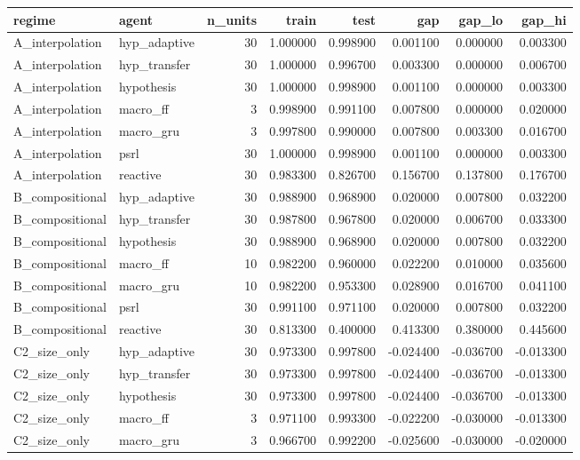 \begin{tabular}{llrrrrrr}
\toprule
regime & agent & n\_units & train & test & gap & gap\_lo & gap\_hi \\
\midrule
A\_interpolation & hyp\_adaptive & 30 & 1.000000 & 0.998900 & 0.001100 & 0.000000 & 0.003300 \\
A\_interpolation & hyp\_transfer & 30 & 1.000000 & 0.996700 & 0.003300 & 0.000000 & 0.006700 \\
A\_interpolation & hypothesis & 30 & 1.000000 & 0.998900 & 0.001100 & 0.000000 & 0.003300 \\
A\_interpolation & macro\_ff & 3 & 0.998900 & 0.991100 & 0.007800 & 0.000000 & 0.020000 \\
A\_interpolation & macro\_gru & 3 & 0.997800 & 0.990000 & 0.007800 & 0.003300 & 0.016700 \\
A\_interpolation & psrl & 30 & 1.000000 & 0.998900 & 0.001100 & 0.000000 & 0.003300 \\
A\_interpolation & reactive & 30 & 0.983300 & 0.826700 & 0.156700 & 0.137800 & 0.176700 \\
B\_compositional & hyp\_adaptive & 30 & 0.988900 & 0.968900 & 0.020000 & 0.007800 & 0.032200 \\
B\_compositional & hyp\_transfer & 30 & 0.987800 & 0.967800 & 0.020000 & 0.006700 & 0.033300 \\
B\_compositional & hypothesis & 30 & 0.988900 & 0.968900 & 0.020000 & 0.007800 & 0.032200 \\
B\_compositional & macro\_ff & 10 & 0.982200 & 0.960000 & 0.022200 & 0.010000 & 0.035600 \\
B\_compositional & macro\_gru & 10 & 0.982200 & 0.953300 & 0.028900 & 0.016700 & 0.041100 \\
B\_compositional & psrl & 30 & 0.991100 & 0.971100 & 0.020000 & 0.007800 & 0.032200 \\
B\_compositional & reactive & 30 & 0.813300 & 0.400000 & 0.413300 & 0.380000 & 0.445600 \\
C2\_size\_only & hyp\_adaptive & 30 & 0.973300 & 0.997800 & -0.024400 & -0.036700 & -0.013300 \\
C2\_size\_only & hyp\_transfer & 30 & 0.973300 & 0.997800 & -0.024400 & -0.036700 & -0.013300 \\
C2\_size\_only & hypothesis & 30 & 0.973300 & 0.997800 & -0.024400 & -0.036700 & -0.013300 \\
C2\_size\_only & macro\_ff & 3 & 0.971100 & 0.993300 & -0.022200 & -0.030000 & -0.013300 \\
C2\_size\_only & macro\_gru & 3 & 0.966700 & 0.992200 & -0.025600 & -0.030000 & -0.020000 \\

\end{tabular}
